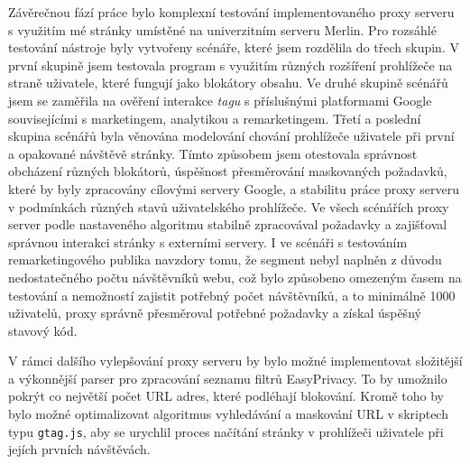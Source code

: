 Závěrečnou fází práce bylo komplexní testování implementovaného proxy serveru s využitím mé stránky umístěné na univerzitním serveru Merlin. Pro rozsáhlé testování nástroje byly vytvořeny scénáře, které jsem rozdělila do třech skupin. V první skupině jsem testovala program s využitím různých rozšíření prohlížeče na straně uživatele, které fungují jako blokátory obsahu. Ve druhé skupině scénářů jsem se zaměřila na ověření interakce {\it tagu} s příslušnými platformami Google souvisejícími s marketingem, analytikou a remarketingem. Třetí a poslední skupina scénářů byla věnována modelování chování prohlížeče uživatele při první a opakované návštěvě stránky. Tímto způsobem jsem otestovala správnost obcházení různých blokátorů, úspěšnost přesměrování maskovaných požadavků, které by byly zpracovány cílovými servery Google, a stabilitu práce proxy serveru v podmínkách různých stavů uživatelského prohlížeče. Ve všech scénářích proxy server podle nastaveného algoritmu stabilně zpracovával požadavky a zajišťoval správnou interakci stránky s externími servery. I ve scénáři s testováním remarketingového publika navzdory tomu, že segment nebyl naplněn z důvodu nedostatečného počtu návštěvníků webu, což bylo způsobeno omezeným časem na testování a nemožností zajistit potřebný počet návštěvníků, a to minimálně 1000 uživatelů, proxy správně přesměroval potřebné požadavky a získal úspěšný stavový kód. 

V rámci dalšího vylepšování proxy serveru by bylo možné implementovat složitější a výkonnější parser pro zpracování seznamu filtrů EasyPrivacy. To by umožnilo pokrýt co největší počet URL adres, které podléhají blokování. Kromě toho by bylo možné optimalizovat algoritmus vyhledávání a maskování URL v skriptech typu \texttt{gtag.js}, aby se urychlil proces načítání stránky v prohlížeči uživatele  při jejích prvních návštěvách.

